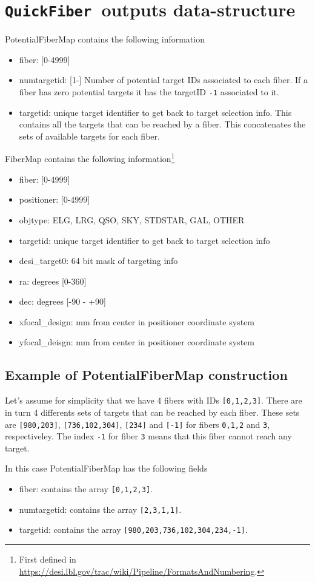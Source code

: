 \documentclass{article}
\newcommand{\code}{{\texttt{QuickFiber}}}
\begin{document}
\section{\code\ outputs data-structure}


PotentialFiberMap contains the following information
\begin{itemize}
\item fiber: [0-4999]
\item numtargetid: [1-] Number of potential target IDs associated to each
  fiber. If a fiber has zero potential targets it has the
  targetID \texttt{-1} associated to it. 
\item targetid:  unique target identifier to get back to target
      selection info. This contains  all the targets that can be
      reached by a fiber. This concatenates the sets of available
      targets for each fiber.
\end{itemize}

\noindent
FiberMap contains the following information\footnote{First defined in
  \url{https://desi.lbl.gov/trac/wiki/Pipeline/FormatsAndNumbering}.} 
\begin{itemize}
    \item fiber: [0-4999]
    \item positioner: [0-4999]
    \item objtype: ELG, LRG, QSO, SKY, STDSTAR, GAL, OTHER
    \item targetid: 
      unique target identifier to get back to target
      selection info 
    \item desi\_target0: 64 bit mask of targeting info 
    \item ra: degrees [0-360] 
    \item dec: degrees [-90 - +90] 
    \item xfocal\_design: mm from center in positioner coordinate system 
    \item yfocal\_deisgn: mm from center in positioner coordinate system  
\end{itemize}



\subsection{Example of PotentialFiberMap construction}
Let's assume for simplicity that we have 4 fibers with IDs
\texttt{[0,1,2,3]}. There are in turn 4 differents sets of targets that
can be reached by each fiber. These sets are \texttt{[980,203]},
\texttt{[736,102,304]}, \texttt{[234]} and \texttt{[-1]} for fibers
\texttt{0,1,2} and \texttt{3}, respectiveley.
The index \texttt{-1} for fiber \texttt{3} means that this fiber
cannot reach any target.

In this case PotentialFiberMap has the following fields
\begin{itemize}
\item
fiber: contains the array \texttt{[0,1,2,3]}.
\item
numtargetid: contains the array \texttt{[2,3,1,1]}.
\item
targetid: contains the array \texttt{[980,203,736,102,304,234,-1]}.

\end{itemize}
\end{document}
